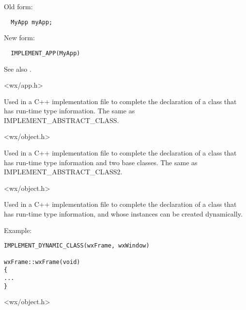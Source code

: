 Old form:

\begin{verbatim}
  MyApp myApp;
\end{verbatim}

New form:

\begin{verbatim}
  IMPLEMENT_APP(MyApp)
\end{verbatim}

See also .


<wx/app.h>



Used in a C++ implementation file to complete the declaration of
a class that has run-time type information. The same as IMPLEMENT\_ABSTRACT\_CLASS.


<wx/object.h>



Used in a C++ implementation file to complete the declaration of a
class that has run-time type information and two base classes. The
same as IMPLEMENT\_ABSTRACT\_CLASS2.


<wx/object.h>



Used in a C++ implementation file to complete the declaration of
a class that has run-time type information, and whose instances
can be created dynamically.

Example:

\begin{verbatim}
IMPLEMENT_DYNAMIC_CLASS(wxFrame, wxWindow)

wxFrame::wxFrame(void)
{
...
}
\end{verbatim}


<wx/object.h>



